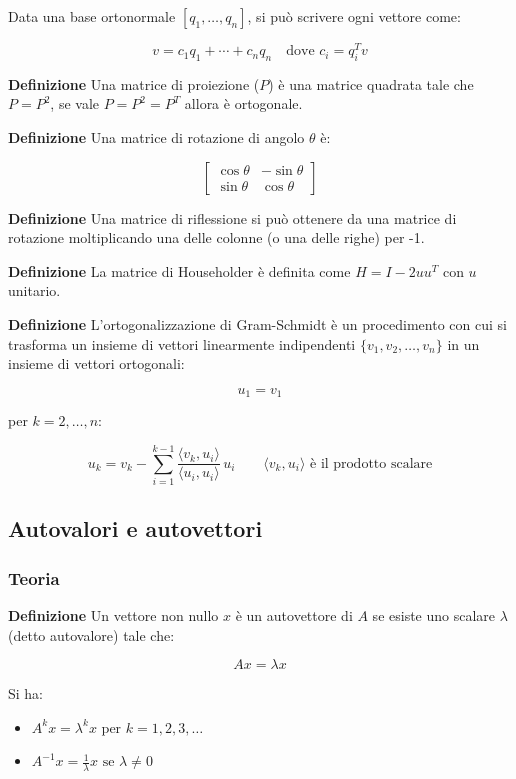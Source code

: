 \documentclass{article}
\newcommand{\df}{\noindent\textbf{Definizione} }
\begin{document}
Data una base ortonormale $[q_1,\ldots,q_n]$, si può scrivere ogni vettore come:

\[
v=c_1q_1+\cdots+c_nq_n\quad \text{dove }c_i=q_i^Tv
\]\newline

\df Una matrice di proiezione ($P$) è una matrice quadrata tale che $P=P^2$, se vale $P=P^2=P^T$ allora è ortogonale.\newline

\df Una matrice di rotazione di angolo $\theta$ è:

\[
\begin{bmatrix}
\cos\theta & -\sin\theta\\
\sin\theta & \cos\theta
\end{bmatrix}
\]\newline

\df Una matrice di riflessione si può ottenere da una matrice di rotazione moltiplicando una delle colonne (o una delle righe) per -1.\newline

\df La matrice di Householder è definita come $H = I - 2uu^T$ con $u$ unitario.\newline

\df L'ortogonalizzazione di Gram-Schmidt è un procedimento con cui si trasforma un insieme di vettori linearmente indipendenti $\{v_1, v_2, \dots, v_n\}$ in un insieme di vettori ortogonali:

\[
u_1 = v_1
\]

per $k = 2, \dots, n$:

\[
u_k = v_k - \sum_{i=1}^{k-1} \frac{\langle v_k, u_i \rangle}
{\langle u_i, u_i \rangle}
\,u_i\qquad\langle v_k, u_i \rangle\text{ è il prodotto scalare}
\]\newpage

\subsection{Autovalori e autovettori}

\subsubsection{Teoria}

\df Un vettore non nullo $x$ è un autovettore di $A$ se esiste uno scalare $\lambda$ (detto autovalore) tale che:

\[
Ax=\lambda x
\]

Si ha:
\begin{itemize}
    \item $A^kx=\lambda^k x\text{ per }k=1,2,3,\ldots$
    \item $A^{-1}x=\frac{1}{\lambda}x \text{ se }\lambda\neq0$\newline
\end{itemize}
\end{document}
